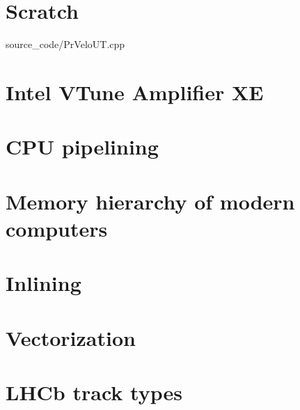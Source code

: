 \documentclass[12pt]{article}
\begin{document}
\newpage
\section{Scratch}


	{source_code/PrVeloUT.cpp}


\appendix

\newpage
\section{Intel VTune Amplifier XE}

\section{CPU pipelining}

\section{Memory hierarchy of modern computers}

\section{Inlining}

\section{Vectorization}

\section{LHCb track types}
\end{document}
